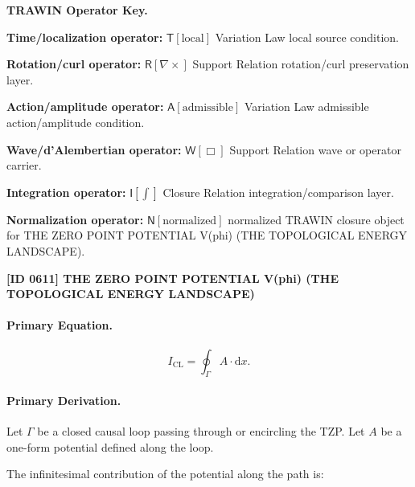 \par\vspace{0.45\baselineskip}
\noindent\begin{minipage}[t]{\linewidth}
\begingroup
\small
\raggedright
\textbf{TRAWIN Operator Key.}\par
\noindent\textbf{Time/localization operator:} $\mathsf{T}\!\left[\mathrm{local}\right]$ Variation Law local source condition.\par
\noindent\textbf{Rotation/curl operator:} $\mathsf{R}\!\left[\nabla\times\right]$ Support Relation rotation/curl preservation layer.\par
\noindent\textbf{Action/amplitude operator:} $\mathsf{A}\!\left[\mathrm{admissible}\right]$ Variation Law admissible action/amplitude condition.\par
\noindent\textbf{Wave/d'Alembertian operator:} $\mathsf{W}\!\left[\Box\right]$ Support Relation wave or operator carrier.\par
\noindent\textbf{Integration operator:} $\mathsf{I}\!\left[\int\right]$ Closure Relation integration/comparison layer.\par
\noindent\textbf{Normalization operator:} $\mathsf{N}\!\left[\mathrm{normalized}\right]$ normalized TRAWIN closure object for THE ZERO POINT POTENTIAL V(phi) (THE TOPOLOGICAL ENERGY LANDSCAPE).\par
\endgroup
\end{minipage}

\clearpage
\noindent\textbf{[ID 0611] THE ZERO POINT POTENTIAL V(phi) (THE TOPOLOGICAL ENERGY LANDSCAPE)}\par
\vspace{0.35em}
\paragraph{Primary Equation.}
\begin{equation}
I_{\mathrm{CL}}
=
\oint_{\Gamma} A\cdot \mathrm{d}x .
\end{equation}

\paragraph{Primary Derivation.}
Let $\Gamma$ be a closed causal loop passing through or encircling the TZP.  
Let $A$ be a one-form potential defined along the loop.

The infinitesimal contribution of the potential along the path is:

